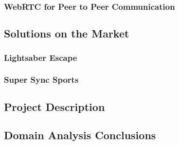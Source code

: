 \subsubsection{WebRTC for Peer to Peer Communication} %

\newpage




\subsection{Solutions on the Market}

\subsubsection{Lightsaber Escape} %

\newpage

\subsubsection{Super Sync Sports} %

\newpage

\subsection{Project Description}

\newpage

\subsection{Domain Analysis Conclusions}

\newpage

\clearpage

